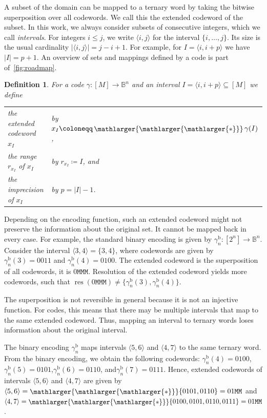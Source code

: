 \documentclass[9pt,journal,compsoc]{IEEEtran}
\newtheorem{definition}[theorem]{Definition}
\theoremstyle{remark}
\DeclareMathOperator{\res}{res}
\newcommand{\bigstarr}{\mathop{\raisebox{-.7pt}{\ensuremath{\mathlarger{\mathlarger{\mathlarger{*}}}}}}}
\newcommand{\mfu}{\mathtt{M}}
\newcommand{\IB}{\mathbb{B}}
\newcommand{\ang}[1]{\langle{#1}\rangle}
\newcommand{\intvl}[1]{\ang{#1}}
\newcommand{\gBin}[1]{\gamma_{#1}^{\operatorname{b}}}
\begin{document}
A subset of the domain can be mapped to a ternary word
  by taking the bitwise superposition over all codewords.
We call this the extended codeword of the subset.
In this work, we always consider subsets of consecutive integers, which we call \emph{intervals}.
For integers $i \leq j$, we write $\langle i, j \rangle$ for the
interval $\{i,\ldots,j\}$. Its size is the usual cardinality $|\langle i,j \rangle| = j - i + 1$. For example, for $I = \langle i, i+p \rangle$ we have  $|I| = p+1$.
%
An overview of sets and mappings defined by a code is part of~\cref{fig:roadmap}.

\begin{definition}\label{def:code_ext}
  For a code $\gamma\colon[M]\rightarrow\IB^n$ and an interval $I=\intvl{i,i+p}\subseteq[M]$ we define
  \begin{center}
    \begin{tabular}{ll}
      the \emph{extended codeword} $x_I$ & by $x_I\coloneqq\bigstarr\gamma(I)$,\\
      the \emph{range} $r_{x_I}$ of $x_I$ & by $r_{x_I}\coloneqq I$, and\\
      the \emph{imprecision} of $x_I$ & by $p=|I|-1$.
    \end{tabular}
  \end{center}
\end{definition}

Depending on the encoding function, such an extended codeword might not preserve
  the information about the original set. 
It cannot be mapped back in every case.
For example, the standard binary encoding is given by 
  $\gBin{n}\colon[2^n]\rightarrow\IB^n$.
Consider the interval $\intvl{3,4}=\{3,4\}$, where codewords are given by 
  $\gBin{n}(3)=0011$ and $\gBin{n}(4)=0100$.
The extended codeword is the superposition of all codewords, it is $0\mfu\mfu\mfu$.
Resolution of the extended codeword yields more codewords,
  such that $\res(0\mfu\mfu\mfu)\neq\{\gBin{n}(3),\gBin{n}(4)\}$.

The superposition is not reversible in general because it is not an injective 
  function.
For codes, this means that there may be multiple intervals that map to the same 
  extended codeword.
Thus, mapping an interval to ternary words loses information about the original 
  interval.

The binary encoding $\gBin{n}$ maps intervals $\intvl{5,6}$ and $\intvl{4,7}$
  to the same ternary word. 
From the binary encoding, we obtain the following codewords:
  $\gBin{n}(4)=0100$,$\gBin{n}(5)=0101$,$\gBin{n}(6)=0110$, and$\gBin{n}(7)=0111$.
Hence, extended codewords of intervals $\intvl{5,6}$ and $\intvl{4,7}$ are
  given by $\intvl{5,6}=\bigstarr\{0101,0110\}=01\mfu\mfu$ and 
  $\intvl{4,7}=\bigstarr\{0100,0101,0110,0111\}=01\mfu\mfu$.
\end{document}
